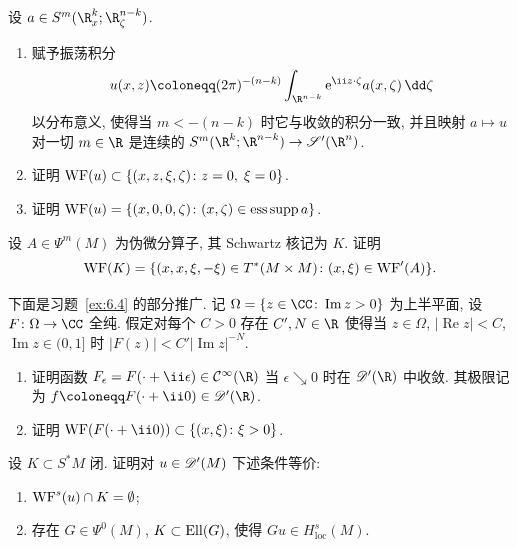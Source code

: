 \begin{exer}[余法分布]\label{ex:6.8}
设 $a \in S^m(\R^k_x; \R^{n-k}_\zeta)$.
\begin{enumerate}
    \item 赋予振荡积分
    \begin{equation}\label{eq:6.126}
        u(x, z) \defeq (2\pi)^{-(n-k)} \int_{\R^{n-k}} \ee^{\ii z \cdot \zeta} a(x, \zeta) \,\dd\zeta
    \end{equation}
    以分布意义, 使得当 $m < -(n-k)$ 时它与收敛的积分一致, 并且映射 $a \mapsto u$ 对一切 $m \in \R$ 是连续的 $S^m(\R^k; \R^{n-k}) \to \mathscr{S}'(\R^n)$.
    \item 证明 $\operatorname{WF}(u) \subset \{(x, z, \xi, \zeta) \colon z = 0, \; \xi = 0\}$.
    \item 证明 $\operatorname{WF}(u) = \{(x, 0, 0, \zeta) \colon (x, \zeta) \in \operatorname{ess\,supp} a\}$.
\end{enumerate}
\end{exer}

\begin{exer}\label{ex:6.9}
设 $A \in \Psi^m(M)$ 为伪微分算子, 其 Schwartz 核记为 $K$. 证明
\begin{equation}\label{eq:6.127}
    \operatorname{WF}(K) = \{(x, x, \xi, -\xi) \in T^*(M \times M) \colon (x, \xi) \in \operatorname{WF}'(A)\}.
\end{equation}
\end{exer}

\begin{exer}[半空间中的全纯函数]\label{ex:6.10}
下面是习题~\ref{ex:6.4} 的部分推广. 记 $\Omega = \{z \in \CC \colon \operatorname{Im} z > 0\}$ 为上半平面, 设 $F \colon \Omega \to \CC$ 全纯. 假定对每个 $C > 0$ 存在 $C', N \in \R$ 使得当 $z \in \Omega$, $|\operatorname{Re} z| < C$, $\operatorname{Im} z \in (0, 1]$ 时 $|F(z)| < C'|\operatorname{Im} z|^{-N}$.
\begin{enumerate}
    \item 证明函数 $F_\epsilon = F(\cdot + \ii\epsilon) \in \Smooth(\R)$ 当 $\epsilon \searrow 0$ 时在 $\Distr(\R)$ 中收敛. 其极限记为 $f \defeq F(\cdot + \ii 0) \in \Distr(\R)$.
    \item 证明 $\WF(F(\cdot + \ii 0)) \subset \{(x, \xi) \colon \xi > 0\}$.
\end{enumerate}
\end{exer}

\begin{exer}[$H^s$ 波前集]\label{ex:6.11}
设 $K \subset S^* M$ 闭. 证明对 $u \in \mathscr{D}'(M)$ 下述条件等价:
\begin{enumerate}
    \item $\operatorname{WF}^s(u) \cap K = \emptyset$;
    \item 存在 $G \in \Psi^0(M)$, $K \subset \operatorname{Ell}(G)$, 使得 $G u \in H^s_{\mathrm{loc}}(M)$.
\end{enumerate}
\end{exer}

